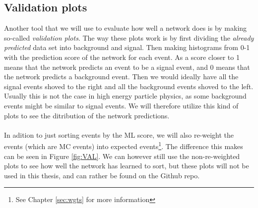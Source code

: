 \documentclass[12pt, a4paper]{book}
\begin{document}
\subsection{Validation plots}\label{sec:validation}
Another tool that we will use to evaluate how well a network does is by making so-called \textit{validation plots}. The way these plots work is by first dividing the \textit{already predicted} data set into background and signal. Then making histograms from 0-1 
with the prediction score of the network for each event. As a score closer to 1 means that the network predicts an event to be a signal event, and 0 means that the network predicts a background event. Then we would ideally have all the signal events shoved to the right and all the background events shoved to the left. 
Usually this is not the case in high energy particle physics, as some background events might be similar to signal events. We will therefore utilize this kind of plots to see the ditribution of the network predictions. \\
\\In adition to just sorting events by the ML score, we will also re-weight the events (which are MC events) into expected events\footnote{See Chapter \ref{sec:wgts} for more information}. The difference this makes can be seen in Figure \ref{fig:VAL}. We can however still use the non-re-weighted plots to see how well the network has learned to sort, but these plots will not be 
used in this thesis, and can rather be found on the Github repo. \\
\end{document}
